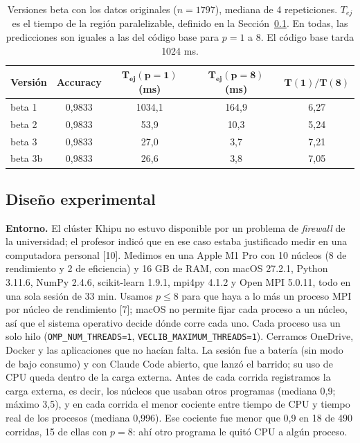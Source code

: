 \documentclass[11pt,a4paper]{article}
\begin{document}
\begin{table}[!htb]
\centering
\small
\begin{tabular}{lcccc}
\toprule
\textbf{Versión} & \textbf{Accuracy} & $\mathbf{T_{ej}(p{=}1)}$ \textbf{(ms)} & $\mathbf{T_{ej}(p{=}8)}$ \textbf{(ms)} & $\mathbf{T(1)/T(8)}$ \\
\midrule
beta 1 & 0,9833 & 1034,1 & 164,9 & 6,27 \\
beta 2 & 0,9833 & 53,9 & 10,3 & 5,24 \\
beta 3 & 0,9833 & 27,0 & 3,7 & 7,21 \\
beta 3b & 0,9833 & 26,6 & 3,8 & 7,05 \\
\bottomrule
\end{tabular}
\caption{Versiones beta con los datos originales ($n = 1797$), mediana de 4 repeticiones. $T_{ej}$ es el tiempo de la región paralelizable, definido en la Sección~\ref{sec:experimental}. En todas, las predicciones son iguales a las del código base para $p = 1$ a $8$. El código base tarda 1024 ms.}
\label{tab:betas}
\end{table}

\subsection{Diseño experimental}
\label{sec:experimental}

\textbf{Entorno.} El clúster Khipu no estuvo disponible por un problema de \textit{firewall} de la universidad; el profesor indicó que en ese caso estaba justificado medir en una computadora personal [10]. Medimos en una Apple M1 Pro con 10 núcleos (8 de rendimiento y 2 de eficiencia) y 16 GB de RAM, con macOS 27.2.1, Python 3.11.6, NumPy 2.4.6, scikit-learn 1.9.1, mpi4py 4.1.2 y Open MPI 5.0.11, todo en una sola sesión de 33 min. Usamos $p \le 8$ para que haya a lo más un proceso MPI por núcleo de rendimiento [7]; macOS no permite fijar cada proceso a un núcleo, así que el sistema operativo decide dónde corre cada uno. Cada proceso usa un solo hilo (\texttt{OMP\_NUM\_THREADS=1}, \texttt{VECLIB\_MAXIMUM\_THREADS=1}). Cerramos OneDrive, Docker y las aplicaciones que no hacían falta. La sesión fue a batería (sin modo de bajo consumo) y con Claude Code abierto, que lanzó el barrido; su uso de CPU queda dentro de la carga externa. Antes de cada corrida registramos la carga externa, es decir, los núcleos que usaban otros programas (mediana 0,9; máximo 3,5), y en cada corrida el menor cociente entre tiempo de CPU y tiempo real de los procesos (mediana 0,996). Ese cociente fue menor que 0,9 en 18 de 490 corridas, 15 de ellas con $p = 8$: ahí otro programa le quitó CPU a algún proceso.
\end{document}
